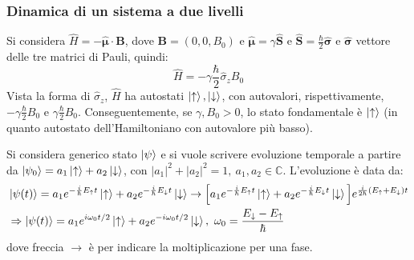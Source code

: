 \documentclass[10pt, a4paper]{scrartcl} %
\numberwithin{equation}{subsection}
\theoremstyle{style2}
\theoremstyle{style1}
\begin{document}
\subsubsection{Dinamica di un sistema a due livelli}

Si considera $\hat{H} = - \hat{\pmb{\mu } }\cdot \mathbf{B} $, dove $\mathbf{B} = (0,0,B_0)$ e $\hat{\pmb{\mu} }= \gamma \hat{\mathbf{S}} $ e $\hat{\mathbf{S}}  = \frac{\hbar }{2} \hat{\pmb{\sigma } }$ e $\hat{\pmb{\sigma }} $ vettore delle tre matrici di Pauli, quindi:
\begin{equation}
	\hat{H} = - \gamma \frac{\hbar}{2} \hat{\sigma}_z B_0 
\end{equation}
Vista la forma di $\hat{\sigma}_z$, $\hat{H}$ ha autostati $\ket{\uparrow} , \ket{\downarrow} $, con autovalori, rispettivamente, $-\gamma \frac{\hbar }{2}B_0$ e $\gamma \frac{\hbar }{2} B_0$.
Conseguentemente, se $\gamma, B_0 >0$, lo stato fondamentale \`e $\ket{\uparrow} $ (in quanto autostato dell'Hamiltoniano con autovalore pi\`u basso).

Si considera generico stato $\ket{\psi } $ e si vuole scrivere evoluzione temporale a partire da $\ket{\psi _0}  = a_{1} \ket{\uparrow} + a_2 \ket{\downarrow} $, con $\lvert a_1 \rvert ^2 + \lvert a_2 \rvert ^2 = 1, \ a_1,a_2 \in \mathbb{C}$. L'evoluzione \`e data da:
\begin{equation}
	\begin{split}
		&\ket{\psi (t)} = a_1 e^{ - \frac{i}{\hbar }E_\uparrow   t} \ket{\uparrow}  + a_2 e^{ - \frac{i}{\hbar } E_\downarrow t} \ket{\downarrow} \to \Big[a_1 e^{ - \frac{i}{\hbar }E_\uparrow   t} \ket{\uparrow}  + a_2 e^{ - \frac{i}{\hbar } E_\downarrow t} \ket{\downarrow}\Big] e^{ \frac{i}{2\hbar } (E_\uparrow+E_\downarrow) t} \\
		&\Rightarrow \ket{\psi (t)} = a_1 e^{i\omega_0 t / 2} \ket{\uparrow} + a_2 e^{ - i \omega_0 t / 2} \ket{\downarrow} , \ \omega_0 = \frac{E_\downarrow- E_\uparrow}{\hbar }
	\end{split}
\end{equation}
dove freccia $\to$ \`e per indicare la moltiplicazione per una fase.
\end{document}
